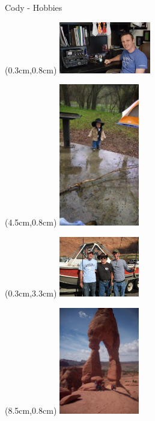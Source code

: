 \documentclass{beamer}
\begin{document}
\begin{frame}{Cody - Hobbies}
   \begin{textblock*}{\textwidth}(0.3cm,0.8cm) %
      \includegraphics[width=4.0cm]{figures/radio.jpg}
   \end{textblock*}
   \begin{textblock*}{\textwidth}(4.5cm,0.8cm) %
      \includegraphics[width=3.5cm]{figures/camping.jpg}
   \end{textblock*}
   \begin{textblock*}{\textwidth}(0.3cm,3.3cm) %
      \includegraphics[width=3.5cm]{figures/fishing.jpg}
   \end{textblock*}
   \begin{textblock*}{\textwidth}(8.5cm,0.8cm) %
      \includegraphics[width=3.5cm]{figures/hiking.jpg}
   \end{textblock*}

\end{frame}
\end{document}
